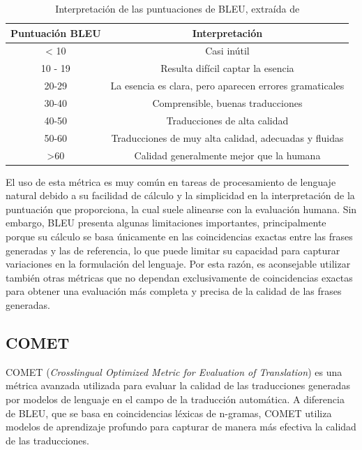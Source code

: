\documentclass[11pt,spanish,listoffigures,listoftables]{tfgetsinf}
\begin{document}
\begin{table}[!h]
\caption{Interpretación de las puntuaciones de BLEU, extraída de \cite{googleTranslate}}
\begin{center}
\begin{tabular}{  c | c  }
	Puntuación BLEU & Interpretación \\
	\hline
	< 10 & Casi inútil \\
	10 - 19 & Resulta difícil captar la esencia \\
	20-29 & La esencia es clara, pero aparecen errores gramaticales \\
	30-40 & Comprensible, buenas traducciones \\
	40-50 & Traducciones de alta calidad \\
	50-60 & Traducciones de muy alta calidad, adecuadas y fluidas \\
	>60 & Calidad generalmente mejor que la humana
\end{tabular}
\end{center}
\label{tab: bleu}
\end{table}

El uso de esta métrica es muy común en tareas de procesamiento de lenguaje natural debido a su facilidad de cálculo y la simplicidad en la interpretación de la puntuación que proporciona, la cual suele alinearse con la evaluación humana. Sin embargo, BLEU presenta algunas limitaciones importantes, principalmente porque su cálculo se basa únicamente en las coincidencias exactas entre las frases generadas y las de referencia, lo que puede limitar su capacidad para capturar variaciones en la formulación del lenguaje. Por esta razón, es aconsejable utilizar también otras métricas que no dependan exclusivamente de coincidencias exactas para obtener una evaluación más completa y precisa de la calidad de las frases generadas.

\subsection{COMET}

COMET (\textit{Crosslingual Optimized Metric for Evaluation of Translation}) \cite{rei2020cometneuralframeworkmt} es una métrica avanzada utilizada para evaluar la calidad de las traducciones generadas por modelos de lenguaje en el campo de la traducción automática. A diferencia de BLEU, que se basa en coincidencias léxicas de n-gramas, COMET utiliza modelos de aprendizaje profundo para capturar de manera más efectiva la calidad de las traducciones.
\end{document}
